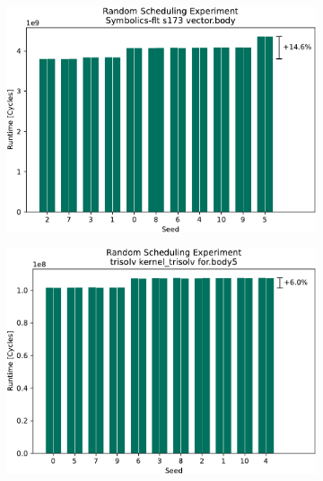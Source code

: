 \begin{figure}
    \begin{subfigure}{0.45\textwidth}
        \includegraphics[width=\textwidth]{img/random-scheduling-experiment-pi-collected/Symbolics-flt-crop.pdf}
        \caption{}
        \label{fig:eval:rndm:aarch64:a}
    \end{subfigure}
    \hfill
    \begin{subfigure}{0.45\textwidth}
        \includegraphics[width=\textwidth]{img/random-scheduling-experiment-pi-collected/trisolv-crop.pdf}
        \caption{}
        \label{fig:eval:rndm:aarch64:b}
    \end{subfigure}
    \begin{subfigure}{0.45\textwidth}

\end{subfigure}
\end{figure}
